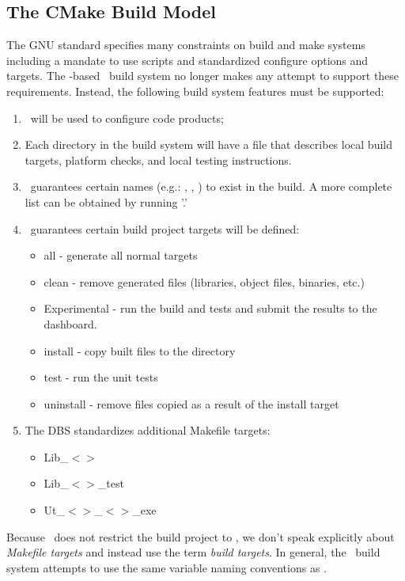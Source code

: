 \subsection{The CMake Build Model}
\label{sec:cmake_build_model}

The GNU standard specifies many constraints on build and make systems including a mandate to use   scripts and standardized configure options and  targets.  The \cmake-based \draco\ build system no longer makes any attempt to support these requirements.  Instead, the following build system features must be supported:
\begin{enumerate}
\item \cmake\ will be used to configure code products;
\item Each directory in the build system will have a  file that describes local build targets, platform checks, and local testing instructions.
\item \cmake\ guarantees certain names (e.g.: , , ) to exist in the build.  A more complete list can be obtained by running '.'
\item \cmake\ guarantees certain build project targets will be defined:
\begin{itemize}
\item all - generate all normal targets
\item clean - remove generated files (libraries, object files, binaries, etc.)
\item Experimental - run the build and tests and submit the results to the dashboard.
\item install - copy built files to the  directory 
\item test -  run the unit tests
\item uninstall - remove files copied as a result of the install target
\end{itemize}
\item The DBS standardizes additional Makefile targets:
\begin{itemize}
\item Lib\_$<$$>$
\item  Lib\_$<$$>$\_test
\item Ut\_$<$$>$\_$<$$>$\_exe
\end{itemize}
\end{enumerate}
Because \cmake\ does not restrict the build project to , we don't speak explicitly about {\it Makefile targets} and instead use the term {\it build targets}.  In general, the \draco\ build system attempts to use the same variable naming conventions as \cmake.

